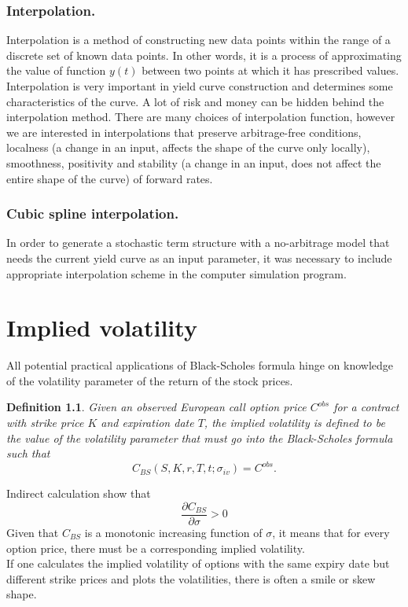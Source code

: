 \documentclass{book}
\newtheorem{definition}{Definition}[section]
\begin{document}
\subsection{Interpolation.}
Interpolation is a method of constructing new data points within the range of a discrete set of known data points. In other words, it is a process of approximating the value of function $y(t)$ between two points at which it has prescribed values.\\
Interpolation is very important in yield curve construction and determines some characteristics of the curve. A lot of risk and money can be hidden behind the interpolation method. There are many choices of interpolation function, however we are interested in interpolations that preserve arbitrage-free conditions, localness (a change in an input, affects the shape of the curve only locally), smoothness, positivity and stability (a change in an input, does not affect the entire shape of the curve) of forward rates.
\subsection{Cubic spline interpolation.}
In order to generate a stochastic term structure with a no-arbitrage model that needs the current yield curve as an input parameter, it was necessary to include appropriate interpolation scheme in the computer simulation program.
\chapter{Implied volatility}
All potential practical applications of Black-Scholes formula hinge on knowledge of the volatility parameter of the return of the stock prices.
\begin{definition}
Given an observed European call option price $C^{obs}$ for a contract with strike price $K$ and expiration date $T$, the implied volatility is defined to be the value of the volatility parameter that must go into the Black-Scholes formula such that
$$
C_{BS}(S,K,r,T,t;\sigma_{iv})=C^{obs}.
$$
\end{definition}
Indirect calculation show that
$$
\frac{\partial C_{BS}}{\partial\sigma}>0
$$
Given that $C_{BS}$ is a monotonic increasing function of $\sigma$, it means that for every option price, there must be a corresponding implied volatility. \\
If one calculates the implied volatility  of options with the same expiry date but different strike prices and plots the volatilities, there is often a smile or skew shape.
\end{document}
